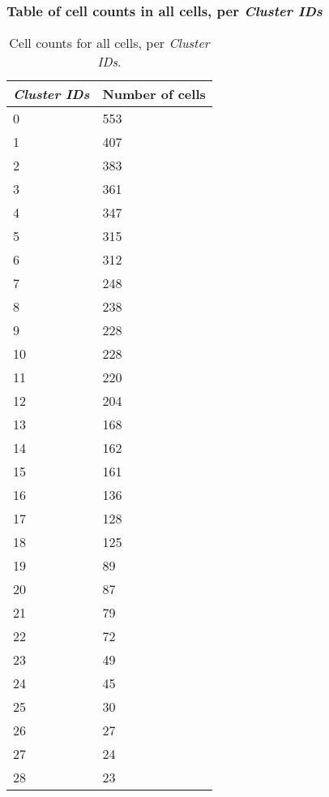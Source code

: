 \subsubsection{Table of cell counts in all cells, per \emph{Cluster IDs}}\begin{table}[h]
\centering
\label{my-label}
\begin{tabular}{@{}ll@{}}
\toprule

\emph{Cluster IDs}& Number of cells \\ \midrule
0 & 553 \\

1 & 407 \\

2 & 383 \\

3 & 361 \\

4 & 347 \\

5 & 315 \\

6 & 312 \\

7 & 248 \\

8 & 238 \\

9 & 228 \\

10 & 228 \\

11 & 220 \\

12 & 204 \\

13 & 168 \\

14 & 162 \\

15 & 161 \\

16 & 136 \\

17 & 128 \\

18 & 125 \\

19 & 89 \\

20 & 87 \\

21 & 79 \\

22 & 72 \\

23 & 49 \\

24 & 45 \\

25 & 30 \\

26 & 27 \\

27 & 24 \\

28 & 23 \\
\bottomrule
\end{tabular}
\caption{Cell counts for all cells, per \emph{Cluster IDs}.}
\end{table}

